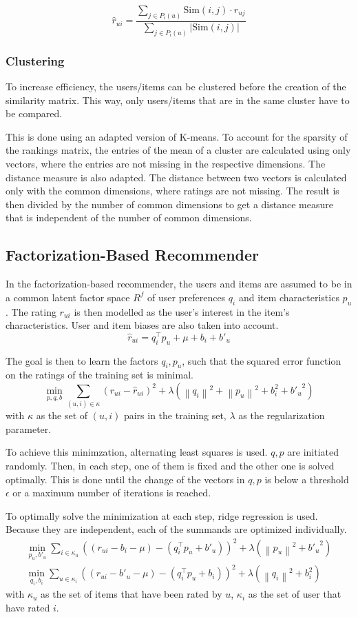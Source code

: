\documentclass[11pt]{scrartcl}
\newcommand{\abs}[1]{\left\vert #1 \right\vert}
\newcommand{\norm}[1]{\left\| #1 \right\|}
\def\T{\top}
\begin{document}
$$\hat{r}_{ui} = \frac{\sum\limits_{j \in P_i(u)} \text{Sim}(i, j) \cdot r_{uj}}{\sum\limits_{j \in P_i(u)} \abs{\text{Sim}(i, j)}}$$

\subsubsection{Clustering}
To increase efficiency, the users/items can be clustered before the creation of the similarity matrix. This way, only users/items that are in the same cluster have to be compared.

This is done using an adapted version of K-means.
To account for the sparsity of the rankings matrix, the entries of the mean of a cluster are calculated using only vectors, where the entries are not missing in the respective dimensions.
The distance measure is also adapted. The distance between two vectors is calculated only with the common dimensions, where ratings are not missing.
The result is then divided by the number of common dimensions to get a distance measure that is independent of the number of common dimensions.


\subsection[Factorization]{Factorization-Based Recommender}
In the factorization-based recommender, the users and items are assumed to be in a common latent factor space $R^f$ of user preferences $q_i$ and item characteristics $p_u$.
The rating $r_{ui}$ is then modelled as the user's interest in the item's characteristics. User and item biases are also taken into account.
$$\hat{r}_{ui} = q_i^\T p_u + \mu + b_i + b'_u$$

The goal is then to learn the factors $q_i, p_u$, such that the squared error function on the ratings of the training set is minimal.
$$\min\limits_{p, q, b} \sum\limits_{(u, i) \in \kappa} (r_{ui} - \hat{r}_{ui})^2 + \lambda \left(\norm{q_i}^2 + \norm{p_u}^2 + b_i^2 + {b'_u}^2\right)$$
with $\kappa$ as the set of $(u, i)$ pairs in the training set, $\lambda$ as the regularization parameter.

To achieve this minimzation, alternating least squares is used.
$q, p$ are initiated randomly.
Then, in each step, one of them is fixed and the other one is solved optimally.
This is done until the change of the vectors in $q, p$ is below a threshold $\epsilon$ or a maximum number of iterations is reached.

To optimally solve the minimization at each step, ridge regression is used.
Because they are independent, each of the summands are optimized individually.
\begin{gather*}
	\min\limits_{p_u, b'_u} \sum\limits_{i \in \kappa_u} \left((r_{ui} - b_i - \mu) - (q_i^\T p_u + b'_u)\right)^2 + \lambda \left(\norm{p_u}^2 + {b'_u}^2\right)\\
	\min\limits_{q_i, b_i} \sum\limits_{u \in \kappa_i} \left((r_{ui} - b'_u - \mu) - (q_i^\T p_u + b_i)\right)^2 + \lambda \left(\norm{q_i}^2 + b_i^2\right)
\end{gather*}
with $\kappa_u$ as the set of items that have been rated by $u$, $\kappa_i$ as the set of user that have rated $i$.
\end{document}
